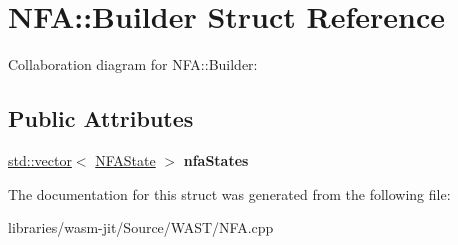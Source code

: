 \hypertarget{struct_n_f_a_1_1_builder}{}\section{N\+FA\+:\+:Builder Struct Reference}
\label{struct_n_f_a_1_1_builder}


Collaboration diagram for N\+FA\+:\+:Builder\+:
\subsection*{Public Attributes}
\begin{DoxyCompactItemize}
\item 
\mbox{\label{struct_n_f_a_1_1_builder_ae099c05cc1744278569e43d01bc0c839}} 
\mbox{\hyperlink{classstd_1_1vector}{std\+::vector}}$<$ \mbox{\hyperlink{struct_n_f_a_1_1_n_f_a_state}{N\+F\+A\+State}} $>$ {\bfseries nfa\+States}
\end{DoxyCompactItemize}


The documentation for this struct was generated from the following file\+:\begin{DoxyCompactItemize}
\item 
libraries/wasm-\/jit/\+Source/\+W\+A\+S\+T/N\+F\+A.\+cpp\end{DoxyCompactItemize}
